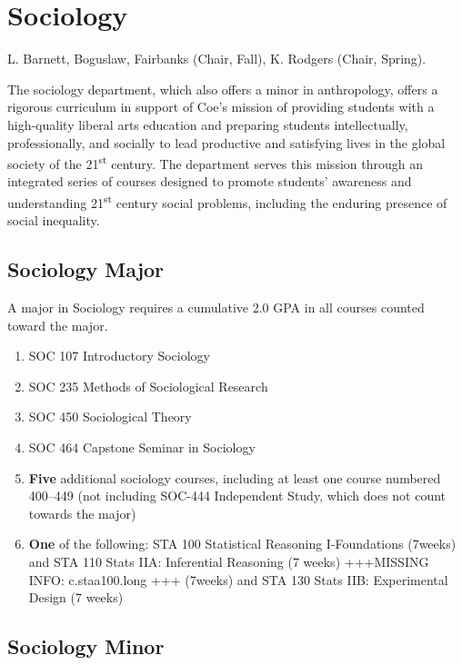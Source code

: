 \documentclass[
  letterpaper,
]{scrbook}
\begin{document}
\hypertarget{sociology}{%
\section{Sociology}\label{sociology}}

L. Barnett, Boguslaw, Fairbanks (Chair, Fall), K. Rodgers (Chair,
Spring).

The sociology department, which also offers a minor in anthropology,
offers a rigorous curriculum in support of Coe's mission of providing
students with a high-quality liberal arts education and preparing
students intellectually, professionally, and socially to lead productive
and satisfying lives in the global society of the 21\textsuperscript{st}
century. The department serves this mission through an integrated series
of courses designed to promote students' awareness and understanding
21\textsuperscript{st} century social problems, including the enduring
presence of social inequality.

\hypertarget{sociology-major}{%
\subsection{Sociology Major}\label{sociology-major}}

A major in Sociology requires a cumulative 2.0 GPA in all courses
counted toward the major.

\begin{enumerate}
\def\labelenumi{\arabic{enumi}.}
\item
  SOC 107 Introductory Sociology
\item
  SOC 235 Methods of Sociological Research
\item
  SOC 450 Sociological Theory
\item
  SOC 464 Capstone Seminar in Sociology
\item
  \textbf{Five} additional sociology courses, including at least one
  course numbered 400--449 (not including SOC-444 Independent Study,
  which does not count towards the major)
\item
  \textbf{One} of the following: STA 100 Statistical Reasoning
  I-Foundations (7weeks) and STA 110 Stats IIA: Inferential Reasoning (7
  weeks) +++MISSING INFO: c.staa100.long +++ (7weeks) and STA 130 Stats
  IIB: Experimental Design (7 weeks)
\end{enumerate}

\hypertarget{sociology-minor}{%
\subsection{Sociology Minor}\label{sociology-minor}}
\end{document}
